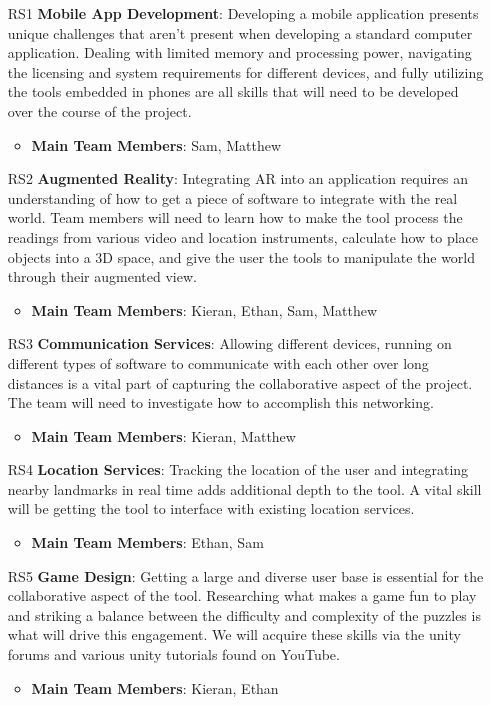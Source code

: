 \documentclass[12pt]{article}
\begin{document}
\begin{itemize}
    \item [RS1]\textbf{Mobile App Development}: Developing a mobile application presents unique challenges that aren't present when developing a standard computer application. Dealing with limited memory and processing power, navigating the licensing and system requirements for different devices, and fully utilizing the tools embedded in phones are all skills that will need to be developed over the course of the project. 
    \begin{itemize}
        \item \textbf{Main Team Members}: Sam, Matthew
    \end{itemize}
    \item [RS2]\textbf{Augmented Reality}: Integrating AR into an application requires an understanding of how to get a piece of software to integrate with the real world. Team members will need to learn how to make the tool process the readings from various video and location instruments, calculate how to place objects into a 3D space, and give the user the tools to manipulate the world through their augmented view. 
    \begin{itemize}
        \item \textbf{Main Team Members}: Kieran, Ethan, Sam, Matthew
    \end{itemize}
    \item [RS3]\textbf{Communication Services}: Allowing different devices, running on different types of software to communicate with each other over long distances is a vital part of capturing the collaborative aspect of the project. The team will need to investigate how to accomplish this networking. 
    \begin{itemize}
        \item \textbf{Main Team Members}: Kieran, Matthew
    \end{itemize}
    \item [RS4]\textbf{Location Services}: Tracking the location of the user and integrating nearby landmarks in real time adds additional depth to the tool. A vital skill will be getting the tool to interface with existing location services. 
    \begin{itemize}
        \item \textbf{Main Team Members}: Ethan, Sam
    \end{itemize}
    \item [RS5]\textbf{Game Design}: Getting a large and diverse user base is essential for the collaborative aspect of the tool. Researching what makes a game fun to play and striking a balance between the difficulty and complexity of the puzzles is what will drive this engagement. We will acquire these skills via the unity forums and various unity tutorials found on YouTube. 
    \begin{itemize}
        \item \textbf{Main Team Members}: Kieran, Ethan
    \end{itemize}
\end{itemize}
\end{document}
